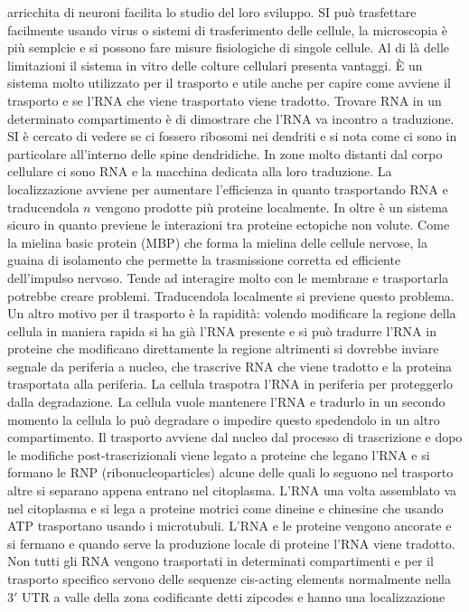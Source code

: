 arricchita di neuroni facilita lo studio del loro sviluppo. SI pu\`o trasfettare facilmente usando virus o sistemi di trasferimento delle cellule, la microscopia \`e pi\`u semplcie
e si possono fare misure fisiologiche di singole cellule. Al di l\`a delle limitazioni il sistema in vitro delle colture cellulari presenta vantaggi. \`E un sistema molto utilizzato 
per il trasporto e utile anche per capire come avviene il trasporto e se l'RNA che viene trasportato viene tradotto. Trovare RNA in un determinato compartimento \`e di dimostrare che 
l'RNA va incontro a traduzione. SI \`e cercato di vedere se ci fossero ribosomi nei dendriti e si nota come ci sono in particolare all'interno delle spine dendridiche. In zone molto
distanti dal corpo cellulare ci sono RNA e la macchina dedicata alla loro traduzione. La localizzazione avviene per aumentare l'efficienza in quanto trasportando RNA e traducendola
$n$ vengono prodotte pi\`u proteine localmente. In oltre \`e un sistema sicuro in quanto previene le interazioni tra proteine ectopiche non volute.  Come la mielina basic protein (MBP)
che forma la mielina delle cellule nervose, la guaina di isolamento che permette la trasmissione corretta ed efficiente dell'impulso nervoso. Tende ad interagire molto con le membrane
e trasportarla potrebbe creare problemi. Traducendola localmente si previene questo problema. Un altro motivo per il trasporto \`e la rapidit\`a: volendo modificare la regione della
cellula in maniera rapida si ha gi\`a l'RNA presente e si pu\`o tradurre l'RNA in proteine che modificano direttamente la regione altrimenti si dovrebbe inviare segnale da periferia a 
nucleo, che trascrive RNA che viene tradotto e la proteina trasportata alla periferia. La cellula traspotra l'RNA in periferia per proteggerlo dalla degradazione. La cellula vuole 
mantenere l'RNA e tradurlo in un secondo momento la cellula lo pu\`o degradare o impedire questo spedendolo in un altro compartimento. Il trasporto avviene dal nucleo dal processo di
trascrizione e dopo le modifiche post-trascrizionali viene legato a proteine che legano l'RNA e si formano le RNP (ribonucleoparticles) alcune delle quali lo seguono nel trasporto altre
si separano appena entrano nel citoplasma. L'RNA una volta assemblato va nel citoplasma e si lega a proteine motrici come dineine e chinesine che usando ATP trasportano usando i 
microtubuli. L'RNA e le proteine vengono ancorate e si fermano e quando serve la produzione locale di proteine l'RNA viene tradotto. Non tutti gli RNA vengono trasportati in determinati
compartimenti e per il trasporto specifico servono delle sequenze cis-acting elements normalmente nella $3'$ UTR a valle della zona codificante detti zipcodes e hanno una localizzazione
